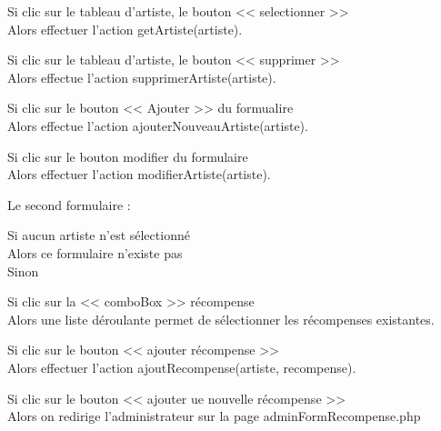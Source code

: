 			\begin{paragraphe}
				Si clic sur le tableau d'artiste, le bouton << selectionner >> \\
				Alors effectuer l'action getArtiste(artiste).
			\end{paragraphe}

			\begin{paragraphe}
				Si clic sur le tableau d'artiste, le bouton << supprimer >> \\
				Alors effectue l'action supprimerArtiste(artiste).
			\end{paragraphe}

			\begin{paragraphe}
				Si clic sur le bouton << Ajouter >> du formualire \\
				Alors effectue l'action ajouterNouveauArtiste(artiste).
			\end{paragraphe}

			\begin{paragraphe}
				Si clic sur le bouton modifier du formulaire \\
				Alors effectuer l'action modifierArtiste(artiste).
			\end{paragraphe}

			\begin{paragraphe}
				Le second formulaire :
			\end{paragraphe}

			\begin{paragraphe}
				Si aucun artiste n'est sélectionné \\
				Alors ce formulaire n'existe pas \\
				Sinon
			\end{paragraphe}

			\begin{paragraphe}
				Si clic sur la << comboBox >> récompense \\
				Alors une liste déroulante permet de sélectionner les récompenses existantes.
			\end{paragraphe}

			\begin{paragraphe}
				Si clic sur le bouton << ajouter récompense >> \\
				Alors effectuer l'action ajoutRecompense(artiste, recompense).
			\end{paragraphe}

			\begin{paragraphe}
				Si clic sur le bouton << ajouter ue nouvelle récompense >> \\
				Alors on redirige l'administrateur sur la page adminFormRecompense.php
			\end{paragraphe}

